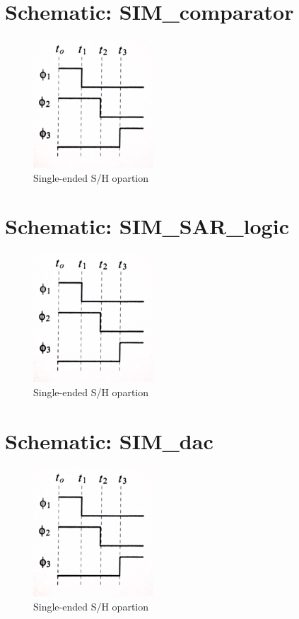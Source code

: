 \documentclass[english, a4paper,11pt]{article}
\begin{document}
\section*{Schematic: SIM\_comparator}
\begin{figure}[!ht]
 \centering
   \includegraphics[width=0.4\textwidth]{img/timing_sample_hold.jpg}
   \caption{Single-ended S/H opartion \cite{CMOS-baker}}
   \label{timing}
\end{figure}
\section*{Schematic: SIM\_SAR\_logic}
\begin{figure}[!ht]
 \centering
   \includegraphics[width=0.4\textwidth]{img/timing_sample_hold.jpg}
   \caption{Single-ended S/H opartion \cite{CMOS-baker}}
   \label{timing}
\end{figure}
\section*{Schematic: SIM\_dac}
\begin{figure}[!ht]
 \centering
   \includegraphics[width=0.4\textwidth]{img/timing_sample_hold.jpg}
   \caption{Single-ended S/H opartion \cite{CMOS-baker}}
   \label{timing}
\end{figure}
\end{document}
